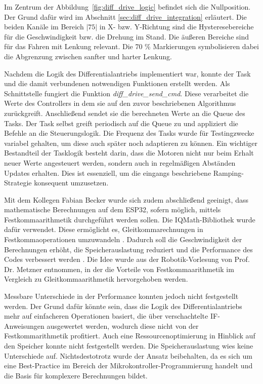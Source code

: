 Im Zentrum der Abbildung~\ref{fig:diff_drive_logic} befindet sich die Nullposition. Der Grund dafür wird im Abschnitt \ref{sec:diff_drive_integration} erläutert. Die beiden Kanäle im Bereich $|75|$ in X- bzw. Y-Richtung sind die Hysteresebereiche für die Geschwindigkeit bzw. die Drehung im Stand. Die äußeren Bereiche sind für das Fahren mit Lenkung relevant. Die 70 \% Markierungen symbolisieren dabei die Abgrenzung zwischen sanfter und harter Lenkung.

Nachdem die Logik des Differentialantriebs implementiert war, konnte der Task und die damit verbundenen notwendigen Funktionen erstellt werden. Als Schnittstelle fungiert die Funktion \textit{diff\_drive\_send\_cmd}. Diese verarbeitet die Werte des Controllers in dem sie auf den zuvor beschriebenen Algorithmus zurückgreift. Anschließend sendet sie die berechneten Werte an die Queue des Tasks. Der Task selbst greift periodisch auf die Queue zu und appliziert die Befehle an die Steuerungslogik. Die Frequenz des Tasks wurde für Testingzwecke variabel gehalten, um diese auch später noch adaptieren zu können. Ein wichtiger Bestandteil der Tasklogik besteht darin, dass die Motoren nicht nur beim Erhalt neuer Werte angesteuert werden, sondern auch in regelmäßigen Abständen Updates erhalten. Dies ist essenziell, um die eingangs beschriebene Ramping-Strategie konsequent umzusetzen. \newline

Mit dem Kollegen Fabian Becker wurde sich zudem abschließend geeinigt, dass mathematische Berechnungen auf dem ESP32, sofern möglich, mittels Festkommaarithmetik durchgeführt werden sollen. Die IQMath-Bibliothek wurde dafür verwendet. Diese ermöglicht es, Gleitkommarechnungen in Festkommaoperationen umzuwandeln \cite{esp32_iqmath}. Dadurch soll die Geschwindigkeit der Berechnungen erhöht, die Speicherauslastung reduziert und die Performance des Codes verbessert werden \cite{esp32_iqmath}. Die Idee wurde aus der Robotik-Vorlesung von Prof. Dr. Metzner entnommen, in der die Vorteile von Festkommaarithmetik im Vergleich zu Gleitkommaarithmetik hervorgehoben werden. \newline

Messbare Unterschiede in der Performance konnten jedoch nicht festgestellt werden. Der Grund dafür könnte sein, dass die Logik des Differentialantriebs mehr auf einfacheren Operationen basiert, die über verschachtelte IF-Anweisungen ausgewertet werden, wodurch diese nicht von der Festkommarithmetik profitiert. Auch eine Ressourcenoptimierung in Hinblick auf den Speicher konnte nicht festgestellt werden. Die Speicherauslastung wies keine Unterschiede auf. Nichtsdestotrotz wurde der Ansatz beibehalten, da es sich um eine Best-Practice im Bereich der Mikrokontroller-Programmierung handelt und die Basis für komplexere Berechnungen bildet. \newline


